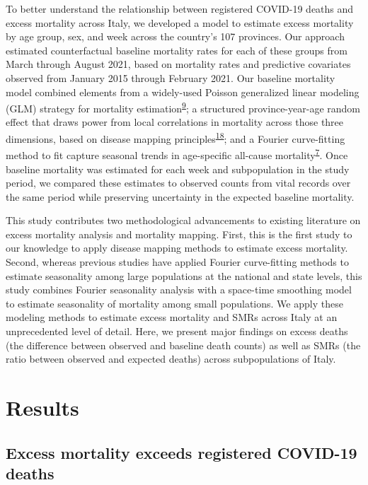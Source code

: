 \documentclass[
]{article}
\begin{document}
To better understand the relationship between registered COVID-19 deaths and excess mortality across Italy, we developed a model to estimate excess mortality by age group, sex, and week across the country's 107 provinces. Our approach estimated counterfactual baseline mortality rates for each of these groups from March through August 2021, based on mortality rates and predictive covariates observed from January 2015 through February 2021. Our baseline mortality model combined elements from a widely-used Poisson generalized linear modeling (GLM) strategy for mortality estimation\textsuperscript{\protect\hyperlink{ref-Noufaily2013}{9}}⁠; a structured province-year-age random effect that draws power from local correlations in mortality across those three dimensions, based on disease mapping principles\textsuperscript{\protect\hyperlink{ref-Banerjee2014}{18}}⁠; and a Fourier curve-fitting method to fit capture seasonal trends in age-specific all-cause mortality\textsuperscript{\protect\hyperlink{ref-Serfling1963}{7}}⁠. Once baseline mortality was estimated for each week and subpopulation in the study period, we compared these estimates to observed counts from vital records over the same period while preserving uncertainty in the expected baseline mortality.

This study contributes two methodological advancements to existing literature on excess mortality analysis and mortality mapping. First, this is the first study to our knowledge to apply disease mapping methods to estimate excess mortality. Second, whereas previous studies have applied Fourier curve-fitting methods to estimate seasonality among large populations at the national and state levels, this study combines Fourier seasonality analysis with a space-time smoothing model to estimate seasonality of mortality among small populations. We apply these modeling methods to estimate excess mortality and SMRs across Italy at an unprecedented level of detail. Here, we present major findings on excess deaths (the difference between observed and baseline death counts) as well as SMRs (the ratio between observed and expected deaths) across subpopulations of Italy.

\hypertarget{results}{%
\section{Results}\label{results}}

\hypertarget{excess-mortality-exceeds-registered-covid-19-deaths}{%
\subsection{Excess mortality exceeds registered COVID-19 deaths}\label{excess-mortality-exceeds-registered-covid-19-deaths}}
\end{document}
